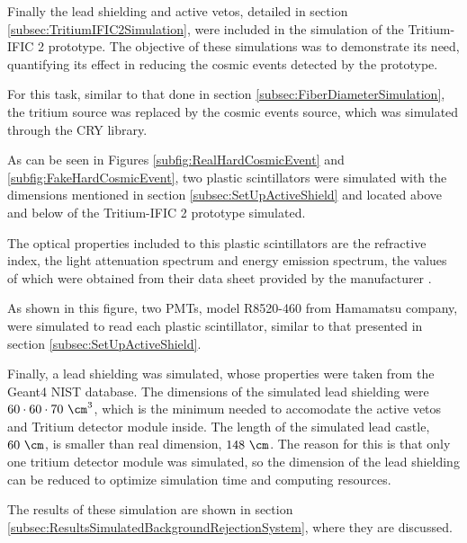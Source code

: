 Finally the lead shielding and active vetos, detailed in section \ref{subsec:TritiumIFIC2Simulation}, were included in the simulation of the Tritium-IFIC 2 prototype. The objective of these simulations was to demonstrate its need, quantifying its effect in reducing the cosmic events detected by the prototype.

For this task, similar to that done in section \ref{subsec:FiberDiameterSimulation}, the tritium source was replaced by the cosmic events source, which was simulated through the CRY library.

As can be seen in Figures \ref{subfig:RealHardCosmicEvent} and \ref{subfig:FakeHardCosmicEvent}, two plastic scintillators were simulated with the dimensions mentioned in section \ref{subsec:SetUpActiveShield} and located above and below of the Tritium-IFIC 2 prototype simulated. 

The optical properties included to this plastic scintillators are the refractive index, the light attenuation spectrum and energy emission spectrum, the values of which were obtained from their data sheet provided by the manufacturer \cite{ScintillatorVeto}.

As shown in this figure, two PMTs, model R8520-460 from Hamamatsu company, were simulated to read each plastic scintillator, similar to that presented in section \ref{subsec:SetUpActiveShield}.

Finally, a lead shielding was simulated, whose properties were taken from the Geant4 NIST database. The dimensions of the simulated lead shielding were $60 \cdot{} 60 \cdot{} 70~\cm^3$, which is the minimum needed to accomodate the active vetos and Tritium detector module inside.  The length of the simulated lead castle, $60~\cm$, is smaller than real dimension, $148~\cm$. The reason for this is that only one tritium detector module was simulated, so the dimension of the lead shielding can be reduced to optimize simulation time and computing resources.

The results of these simulation are shown in section \ref{subsec:ResultsSimulatedBackgroundRejectionSystem}, where they are discussed.